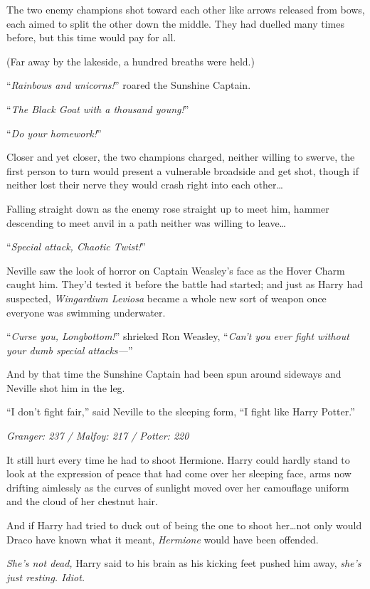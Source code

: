 The two enemy champions shot toward each other like arrows released from bows, each aimed to split the other down the middle. They had duelled many times before, but this time would pay for all.

(Far away by the lakeside, a hundred breaths were held.)

“\emph{Rainbows and unicorns!}” roared the Sunshine Captain.

“\emph{The Black Goat with a thousand young!}”

“\emph{Do your homework!}”

Closer and yet closer, the two champions charged, neither willing to swerve, the first person to turn would present a vulnerable broadside and get shot, though if neither lost their nerve they would crash right into each other…

Falling straight down as the enemy rose straight up to meet him, hammer descending to meet anvil in a path neither was willing to leave…

“\emph{Special attack, Chaotic Twist!}”

Neville saw the look of horror on Captain Weasley’s face as the Hover Charm caught him. They’d tested it before the battle had started; and just as Harry had suspected, \emph{Wingardium Leviosa} became a whole new sort of weapon once everyone was swimming underwater.

“\emph{Curse you, Longbottom!}” shrieked Ron Weasley, “\emph{Can’t you ever fight without your dumb special attacks—}”

And by that time the Sunshine Captain had been spun around sideways and Neville shot him in the leg.

“I don’t fight fair,” said Neville to the sleeping form,
“I fight like Harry Potter.”

\later

\emph{Granger: 237 / Malfoy: 217 / Potter: 220}

It still hurt every time he had to shoot Hermione. Harry could hardly stand to look at the expression of peace that had come over her sleeping face, arms now drifting aimlessly as the curves of sunlight moved over her camouflage uniform and the cloud of her chestnut hair.

And if Harry had tried to duck out of being the one to shoot her…not only would Draco have known what it meant, \emph{Hermione} would have been offended.

\emph{She’s not dead,} Harry said to his brain as his kicking feet pushed him away, \emph{she’s just resting. \emph{Idiot.}}


